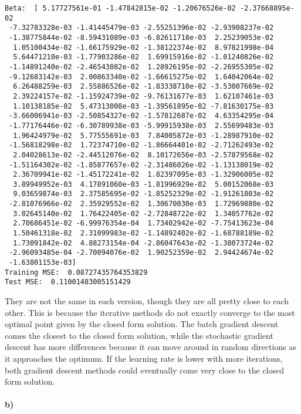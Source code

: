 \documentclass[12pt]{article}
\begin{document}
\begin{verbatim}
Beta:  [ 5.17727561e-01 -1.47842815e-02 -1.20676526e-02 -2.37668895e-02
 -7.32783328e-03 -1.41445479e-03 -2.55251396e-02 -2.93908237e-02
 -1.38775844e-02 -8.59431089e-03 -6.82611718e-03  2.25239053e-02
  1.05100434e-02 -1.66175929e-02 -1.38122374e-02  8.97821998e-04
  5.64471210e-03 -1.77903286e-02  1.69915916e-02 -1.01240826e-02
 -1.14891240e-02 -2.46543082e-02  1.28926195e-02 -2.26955305e-02
 -9.12683142e-03  2.00863340e-02 -1.66615275e-02  1.64042064e-02
  6.26488259e-03  2.55886526e-02 -1.83338710e-02 -3.53007669e-02
  2.39224157e-02 -1.15924739e-02 -9.76131677e-03  1.62107461e-03
  1.10138185e-02  5.47313008e-03 -1.39561895e-02 -7.81630175e-03
 -3.66006941e-03 -2.50854327e-02 -1.57812687e-02  4.63354295e-04
 -1.77176446e-02 -6.30789938e-03 -5.99915938e-03  2.55699483e-03
  1.96424979e-02  5.77555691e-03  7.84005872e-03 -1.28987910e-02
 -1.56818298e-02  1.72374710e-02 -1.86664401e-02 -2.71262493e-02
  2.04028613e-02 -2.44512076e-02  8.10172656e-03 -2.57879568e-02
 -1.51164302e-02 -1.85877657e-02 -2.31486026e-02 -1.13138019e-02
  2.36709941e-02 -1.45172241e-02  1.82397095e-03 -1.32906005e-02
  3.89949952e-03  4.17891060e-03 -1.81996929e-02  5.00152068e-03
  9.03659874e-03  2.37585695e-02 -1.85252329e-02 -1.91261803e-02
 -2.81076966e-02  2.35929552e-02  1.30670030e-03  1.72969880e-02
  3.02645140e-02  1.76422405e-02 -2.72848722e-02  1.34057762e-02
  2.70686451e-02 -6.99976354e-04  1.73402942e-02 -7.75413623e-04
  1.50461318e-02  2.31099983e-02 -1.14892402e-02 -1.68788189e-02
  1.73091842e-02  4.88273154e-04 -2.86047643e-02 -1.38073724e-02
 -2.96093485e-04 -2.70094076e-02  1.90252359e-02  2.94424674e-02
 -1.63801153e-03]
Training MSE:  0.08727435764353829
Test MSE:  0.11001483005151429
\end{verbatim}
\normalsize
They are not the same in each version, though they are all pretty close to each other.
This is because the iterative methods do not exactly converge to the most optimal point given
by the closed form solution. The batch gradient descent comes the closest to the closed form
solution, while the stochastic gradient descent has more differences because it can move around
in random directions as it approaches the optimum. If the learning rate is lower with more iterations,
both gradient descent methods could eventually come very close to the closed form solution.

\paragraph{b)}
\end{document}
